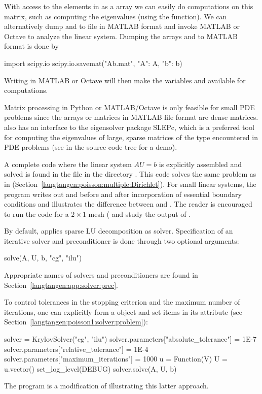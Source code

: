 With access to the elements in  as a  array we can easily
do computations on this matrix, such as computing the eigenvalues
(using the  function). We can alternatively dump
 and  to file in MATLAB format and invoke MATLAB or Octave to
analyze the linear system.
Dumping the arrays  and  to MATLAB format is done by
\begin{python}
import scipy.io
scipy.io.savemat("Ab.mat", {"A": A, "b": b})
\end{python}
Writing  in MATLAB or Octave will then make
the variables  and  available for computations.

Matrix processing in Python or MATLAB/Octave is only feasible for
small PDE problems since the  arrays or matrices in MATLAB
file format are dense matrices. \dolfin{} also has an interface to the
eigensolver package SLEPc, which is a preferred tool for computing the
eigenvalues of large, sparse matrices of the type encountered in PDE
problems (see  in the \dolfin{} source code tree for
a demo).

A complete code where the linear system $AU=b$ is explicitly assembled and
solved is found in the file  in the directory
. This code solves the same problem as in
(Section~\ref{langtangen:poisson:multiple:Dirichlet}).  For small
linear systems, the program writes out  and  before and
after incorporation of essential boundary conditions and illustrates
the difference between  and .
The reader is encouraged to run the code for a $2\times 1$
mesh ( and study the output of .

By default,  applies sparse LU decomposition
as solver. Specification of an iterative solver and preconditioner
is done through two optional arguments:
\begin{python}
solve(A, U, b, "cg", "ilu")
\end{python}
Appropriate names of solvers and preconditioners are found in
Section~\ref{langtangen:app:solver:prec}.

To control tolerances in the stopping criterion and the maximum
number of iterations, one can explicitly form a  object
and set items in its  attribute
(see Section~\ref{langtangen:poisson1:solver:problem}):
\begin{python}
solver = KrylovSolver("cg", "ilu")
solver.parameters["absolute_tolerance"] = 1E-7
solver.parameters["relative_tolerance"] = 1E-4
solver.parameters["maximum_iterations"] = 1000
u = Function(V)
U = u.vector()
set_log_level(DEBUG)
solver.solve(A, U, b)
\end{python}
The program  is a modification of 
illustrating this latter approach.

